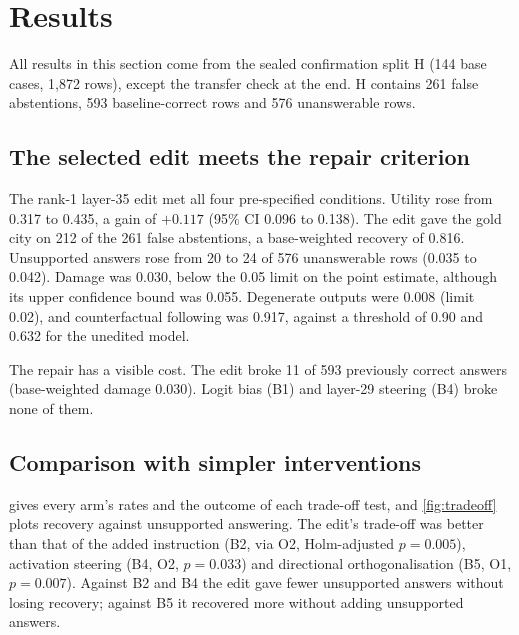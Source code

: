 \section{Results}
\label{sec:results}

All results in this section come from the sealed confirmation split H (144 base cases, 1,872 rows), except the
transfer check at the end. H contains 261 false abstentions, 593 baseline-correct rows and 576 unanswerable rows.

\subsection{The selected edit meets the repair criterion}

The rank-1 layer-35 edit met all four pre-specified conditions. Utility rose from 0.317 to 0.435, a gain of
$+0.117$ (95\% CI 0.096 to 0.138). The edit gave the gold city on 212 of the 261 false abstentions, a base-weighted
recovery of 0.816. Unsupported answers rose from 20 to 24 of 576 unanswerable rows (0.035 to 0.042). Damage was
0.030, below the 0.05 limit on the point estimate, although its upper confidence bound was 0.055. Degenerate
outputs were 0.008 (limit 0.02), and counterfactual following was 0.917, against a threshold of 0.90 and 0.632 for
the unedited model.

The repair has a visible cost. The edit broke 11 of 593 previously correct answers (base-weighted damage 0.030).
Logit bias (B1) and layer-29 steering (B4) broke none of them.

\subsection{Comparison with simpler interventions}

 gives every arm's rates and the outcome of each trade-off test, and \cref{fig:tradeoff} plots recovery
against unsupported answering. The edit's trade-off was better than that of the added instruction (B2, via O2,
Holm-adjusted $p = 0.005$), activation steering (B4, O2, $p = 0.033$) and directional orthogonalisation (B5, O1,
$p = 0.007$). Against B2 and B4 the edit gave fewer unsupported answers without losing recovery; against B5 it
recovered more without adding unsupported answers.

